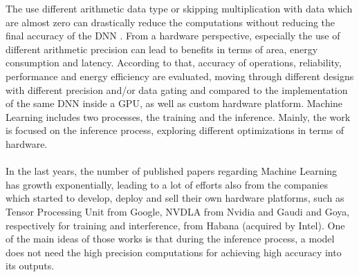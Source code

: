 The use different arithmetic data type or skipping multiplication with data which are almost zero can drastically reduce the computations without reducing the final accuracy of the DNN \cite{paper:7}\cite{paper:8}. From a hardware perspective, especially the use of different arithmetic precision\cite{paper:14} can lead to benefits in terms of area, energy consumption and latency.\newline
According to that, accuracy of operations, reliability, performance and energy efficiency are evaluated, moving through different designs with different precision and/or data gating and compared to the implementation of the same DNN inside a GPU, as well as custom hardware platform.
\newpage
Machine Learning includes two processes, the training and the inference. Mainly, the work is focused on the inference process, exploring different optimizations in terms of hardware.\\\\
In the last years, the number of published papers regarding Machine Learning has growth exponentially, leading to a lot of efforts also from the companies which started to develop, deploy and sell their own hardware platforms, such as Tensor Processing Unit from Google, NVDLA from Nvidia and Gaudi and Goya, respectively for training and interference, from Habana (acquired by Intel). \newline
One of the main ideas of those works is that during the inference process, a model does not need the high precision computations \cite{paper:8} \cite{paper:15}for achieving high accuracy into its outputs.\\
